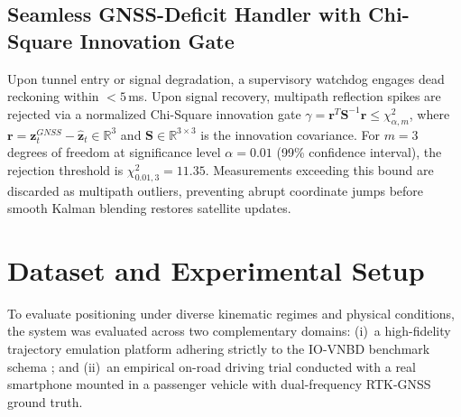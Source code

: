\documentclass[conference]{IEEEtran}
\begin{document}
\subsection{Seamless GNSS-Deficit Handler with Chi-Square Innovation Gate}
Upon tunnel entry or signal degradation, a supervisory watchdog engages dead reckoning within $<5$\,ms. Upon signal recovery, multipath reflection spikes are rejected via a normalized Chi-Square innovation gate $\gamma = \mathbf{r}^T\mathbf{S}^{-1}\mathbf{r} \leq \chi^2_{\alpha,m}$, where $\mathbf{r} = \mathbf{z}_t^{GNSS} - \hat{\mathbf{z}}_t \in \mathbb{R}^3$ and $\mathbf{S} \in \mathbb{R}^{3\times 3}$ is the innovation covariance. For $m=3$ degrees of freedom at significance level $\alpha = 0.01$ (99\% confidence interval), the rejection threshold is $\chi^2_{0.01, 3} = 11.35$. Measurements exceeding this bound are discarded as multipath outliers, preventing abrupt coordinate jumps before smooth Kalman blending restores satellite updates.

\section{Dataset and Experimental Setup}

To evaluate positioning under diverse kinematic regimes and physical conditions, the system was evaluated across two complementary domains: (i)~a high-fidelity trajectory emulation platform adhering strictly to the IO-VNBD benchmark schema \cite{onyekpe2021}; and (ii)~an empirical on-road driving trial conducted with a real smartphone mounted in a passenger vehicle with dual-frequency RTK-GNSS ground truth.
\end{document}
